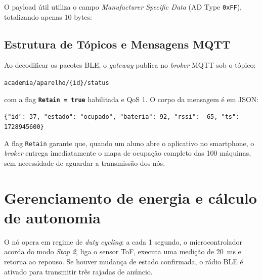 \documentclass[11pt,a4paper]{article}
\begin{document}
O payload útil utiliza o campo \emph{Manufacturer Specific Data} (AD Type \texttt{0xFF}),
totalizando apenas 10 bytes:
\begin{center}
\end{center}

\subsection{Estrutura de Tópicos e Mensagens MQTT}
Ao decodificar os pacotes BLE, o \emph{gateway} publica no \emph{broker} MQTT sob o tópico:
\begin{center}
\texttt{academia/aparelho/\{id\}/status}
\end{center}
com a flag \textbf{\texttt{Retain = true}} habilitada e QoS 1. O corpo da mensagem é em JSON:
\begin{center}
\small
\texttt{\{"id": 37, "estado": "ocupado", "bateria": 92, "rssi": -65, "ts": 1728945600\}}
\end{center}
A flag \texttt{Retain} garante que, quando um aluno abre o aplicativo no smartphone, o
\emph{broker} entrega imediatamente o mapa de ocupação completo das 100 máquinas, sem
necessidade de aguardar a transmissão dos nós.

\section{Gerenciamento de energia e cálculo de autonomia}

O nó opera em regime de \emph{duty cycling}: a cada 1 segundo, o microcontrolador acorda do
modo \emph{Stop 2}, liga o sensor ToF, executa uma medição de 20~ms e retorna ao repouso.
Se houver mudança de estado confirmada, o rádio BLE é ativado para transmitir três rajadas
de anúncio.
\end{document}
